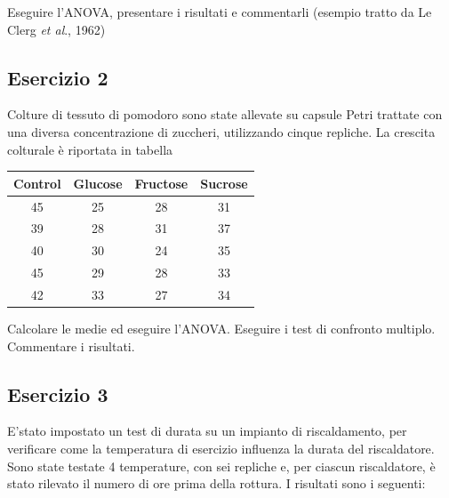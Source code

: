 \documentclass[a4paper,12pt,oneside]{book}
\begin{document}
Eseguire l'ANOVA, presentare i risultati e commentarli (esempio tratto da Le Clerg \emph{et al}., 1962)

\hypertarget{esercizio-2-4}{%
\subsection{Esercizio 2}\label{esercizio-2-4}}

Colture di tessuto di pomodoro sono state allevate su capsule Petri trattate con una diversa concentrazione di zuccheri, utilizzando cinque repliche. La crescita colturale è riportata in tabella

\begin{longtable}[]{@{}cccc@{}}
\toprule
Control & Glucose & Fructose & Sucrose \\
\midrule
\endhead
45 & 25 & 28 & 31 \\
39 & 28 & 31 & 37 \\
40 & 30 & 24 & 35 \\
45 & 29 & 28 & 33 \\
42 & 33 & 27 & 34 \\
\bottomrule
\end{longtable}

Calcolare le medie ed eseguire l'ANOVA. Eseguire i test di confronto multiplo. Commentare i risultati.

\hypertarget{esercizio-3-4}{%
\subsection{Esercizio 3}\label{esercizio-3-4}}

E'stato impostato un test di durata su un impianto di riscaldamento, per verificare come la temperatura di esercizio influenza la durata del riscaldatore. Sono state testate 4 temperature, con sei repliche e, per ciascun riscaldatore, è stato rilevato il numero di ore prima della rottura. I risultati sono i seguenti:
\end{document}
